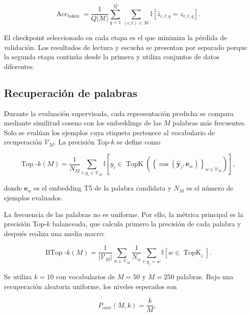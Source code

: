 \begin{equation}
\operatorname{Acc}_{\mathrm{token}} =
\frac{1}{Q|\mathcal{M}|}
\sum_{q=1}^{Q}
\sum_{(c,t)\in\mathcal{M}}
\mathbb{I}
\left[
\widehat{z}_{c,t,q}=z_{c,t,q}
\right].
\end{equation}

El checkpoint seleccionado en cada etapa es el que minimiza la pérdida de validación. Los resultados de lectura y escucha se presentan por separado porque la segunda etapa continúa desde la primera y utiliza conjuntos de datos diferentes.

\subsection{Recuperación de palabras}

Durante la evaluación supervisada, cada representación predicha se compara mediante similitud coseno con los embeddings de las \(M\) palabras más frecuentes. Solo se evalúan los ejemplos cuya etiqueta pertenece al vocabulario de recuperación
\(\mathcal{V}_M\). La precisión Top-\(k\) se define como

\begin{equation}
\operatorname{Top}\text{-}k(M) =
\frac{1}{N_M}
\sum_{i:y_i\in\mathcal{V}_M}
\mathbb{I}
\left[
y_i\in
\operatorname{TopK}
\left(
\left\{
\cos
\left(
\widehat{\mathbf{y}}_i,
\mathbf{e}_w
\right)
\right\}_{w\in\mathcal{V}_M}
\right)
\right],
\end{equation}

\noindent donde \(\mathbf{e}_w\) es el embedding T5 de la palabra candidata y
\(N_M\) es el número de ejemplos evaluados.

La frecuencia de las palabras no es uniforme. Por ello, la métrica principal es la precisión Top-\(k\) balanceada, que calcula primero la precisión de cada palabra y después realiza una media macro:

\begin{equation}
\operatorname{BTop}\text{-}k(M) =
\frac{1}{|\mathcal{V}_M|}
\sum_{w\in\mathcal{V}_M}
\frac{1}{N_w}
\sum_{i:y_i=w}
\mathbb{I}
\left[
w\in\operatorname{TopK}_i
\right].
\end{equation}

Se utiliza \(k=10\) con vocabularios de \(M=50\) y \(M=250\) palabras. Bajo una recuperación aleatoria uniforme, los niveles esperados son

\begin{equation}
P_{\mathrm{azar}}(M,k)=\frac{k}{M},
\end{equation}


